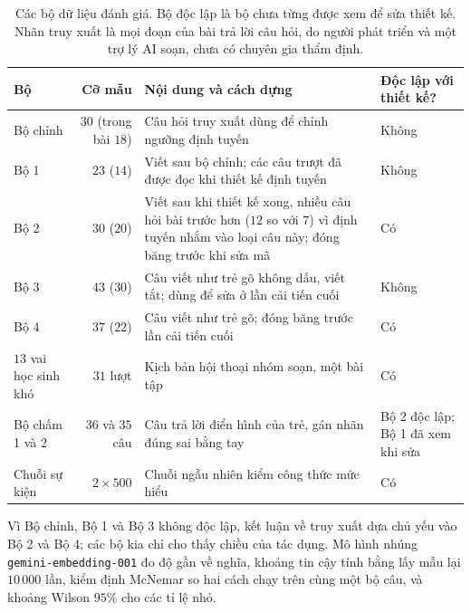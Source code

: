 \begin{table}[H]
\centering
\caption{Các bộ dữ liệu đánh giá. Bộ độc lập là bộ chưa từng được xem để sửa thiết kế. Nhãn truy xuất là mọi đoạn của bài trả lời câu hỏi, do người phát triển và một trợ lý AI soạn, chưa có chuyên gia thẩm định.}\label{tab:eval-sets}
\small
\begin{tabular}{>{\raggedright\arraybackslash}p{2.7cm}r>{\raggedright\arraybackslash}p{5.2cm}>{\raggedright\arraybackslash}p{4.3cm}}
\toprule
Bộ & Cỡ mẫu & Nội dung và cách dựng & Độc lập với thiết kế? \\
\midrule
Bộ chỉnh & $30$ (trong bài $18$) & Câu hỏi truy xuất dùng để chỉnh ngưỡng định tuyến & Không \\
Bộ 1 & $23$ ($14$) & Viết sau bộ chỉnh; các câu trượt đã được đọc khi thiết kế định tuyến & Không \\
Bộ 2 & $30$ ($20$) & Viết sau khi thiết kế xong, nhiều câu hỏi bài trước hơn ($12$ so với $7$) vì định tuyến nhắm vào loại câu này; đóng băng trước khi sửa mã & Có \\
Bộ 3 & $43$ ($30$) & Câu viết như trẻ gõ không dấu, viết tắt; dùng để sửa ở lần cải tiến cuối & Không \\
Bộ 4 & $37$ ($22$) & Câu viết như trẻ gõ; đóng băng trước lần cải tiến cuối & Có \\
$13$ vai học sinh khó & $31$ lượt & Kịch bản hội thoại nhóm soạn, một bài tập & Có \\
Bộ chấm 1 và 2 & $36$ và $35$ câu & Câu trả lời điển hình của trẻ, gán nhãn đúng sai bằng tay & Bộ 2 độc lập; Bộ 1 đã xem khi sửa \\
Chuỗi sự kiện & $2\times500$ & Chuỗi ngẫu nhiên kiểm công thức mức hiểu & Có \\
\bottomrule
\end{tabular}
\end{table}

Vì Bộ chỉnh, Bộ 1 và Bộ 3 không độc lập, kết luận về truy xuất dựa chủ yếu vào Bộ 2 và Bộ 4; các bộ kia chỉ cho thấy chiều của tác dụng. Mô hình nhúng \texttt{gemini-embedding-001} đo độ gần về nghĩa, khoảng tin cậy tính bằng lấy mẫu lại $10\,000$ lần, kiểm định McNemar so hai cách chạy trên cùng một bộ câu, và khoảng Wilson $95\%$ cho các tỉ lệ nhỏ.


